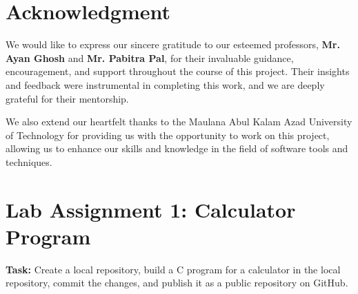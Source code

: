 \documentclass[a4paper,12pt]{article}
\begin{document}
\newpage
\section*{Acknowledgment}

We would like to express our sincere gratitude to our esteemed professors, \textbf{Mr. Ayan Ghosh} and \textbf{Mr. Pabitra Pal}, for their invaluable guidance, encouragement, and support throughout the course of this project. Their insights and feedback were instrumental in completing this work, and we are deeply grateful for their mentorship.

We also extend our heartfelt thanks to the Maulana Abul Kalam Azad University of Technology for providing us with the opportunity to work on this project, allowing us to enhance our skills and knowledge in the field of software tools and techniques.

\vspace{1in}

\noindent\makebox[0.5\textwidth]{\hrulefill} \hfill \makebox[0.5\textwidth]{\hrulefill}

\noindent{} \hfill {}


\newpage

\newpage %
\tableofcontents %

\newpage %

\section{Lab Assignment 1: Calculator Program}

\textbf{Task:} Create a local repository, build a C program for a calculator in the local repository, commit the changes, and publish it as a public repository on GitHub.
\end{document}
